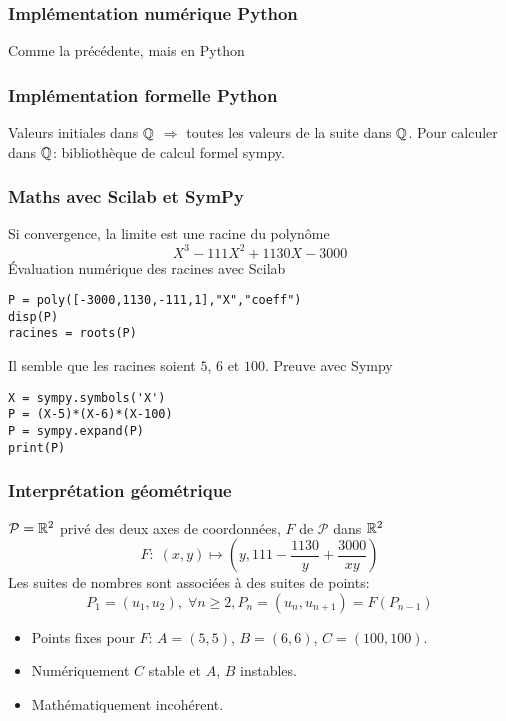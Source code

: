 \begin{frame}
  \frametitle{Implémentation numérique Python}
Comme la précédente, mais en Python

\end{frame}

\begin{frame}
  \frametitle{Implémentation formelle Python}
Valeurs initiales dans $\mathbb{Q}$ $\Rightarrow$ toutes les valeurs de la suite dans $\mathbb{Q}$.\newline
Pour calculer dans $\mathbb{Q}$: bibliothèque de calcul formel sympy.

\end{frame}

\begin{frame}[fragile]
  \frametitle{Maths avec Scilab et SymPy}
Si convergence, la limite est une racine du polynôme
\begin{displaymath}
  X^3 - 111X^2+1130X-3000
\end{displaymath}
\'Evaluation numérique des racines avec Scilab
\begin{verbatim}
P = poly([-3000,1130,-111,1],"X","coeff")
disp(P)
racines = roots(P)  
\end{verbatim}
Il semble que les racines soient $5$, $6$ et $100$. Preuve avec Sympy
\begin{verbatim}
X = sympy.symbols('X')
P = (X-5)*(X-6)*(X-100)
P = sympy.expand(P)
print(P)
\end{verbatim}
\end{frame}

\begin{frame}
  \frametitle{Interprétation géométrique}
$\mathcal{P} = \mathbb{R}^2$ privé des deux axes de coordonnées, $F$ de $\mathcal{P}$ dans $\mathbb{R}^2$ 
\begin{displaymath}
 F:\; (x,y)\mapsto (y, 111 - \frac{1130}{y} + \frac{3000}{xy})
\end{displaymath}
Les suites de nombres sont associées à des suites de points:
\begin{displaymath}
  P_1 = (u_1,u_2),\; \forall n\geq 2, P_n = (u_n,u_{n+1}) = F(P_{n-1})
\end{displaymath}
\begin{itemize}
  \item Points fixes pour $F$: $A=(5,5)$, $B=(6,6)$, $C=(100,100)$.
  \item Numériquement $C$ stable et $A$, $B$ instables.
  \item Mathématiquement incohérent.
\end{itemize}
\end{frame}

